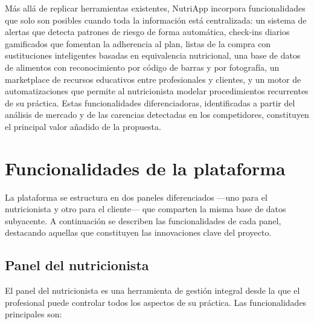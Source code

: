 Más allá de replicar herramientas existentes, NutriApp incorpora funcionalidades que solo son posibles cuando toda la información está centralizada: un sistema de alertas que detecta patrones de riesgo de forma automática, check-ins diarios gamificados que fomentan la adherencia al plan, listas de la compra con sustituciones inteligentes basadas en equivalencia nutricional, una base de datos de alimentos con reconocimiento por código de barras y por fotografía, un marketplace de recursos educativos entre profesionales y clientes, y un motor de automatizaciones que permite al nutricionista modelar procedimientos recurrentes de su práctica. Estas funcionalidades diferenciadoras, identificadas a partir del análisis de mercado y de las carencias detectadas en los competidores, constituyen el principal valor añadido de la propuesta.

\section{Funcionalidades de la plataforma}

La plataforma se estructura en dos paneles diferenciados ---uno para el nutricionista y otro para el cliente--- que comparten la misma base de datos subyacente. A continuación se describen las funcionalidades de cada panel, destacando aquellas que constituyen las innovaciones clave del proyecto.

\subsection{Panel del nutricionista}

El panel del nutricionista es una herramienta de gestión integral desde la que el profesional puede controlar todos los aspectos de su práctica. Las funcionalidades principales son:

